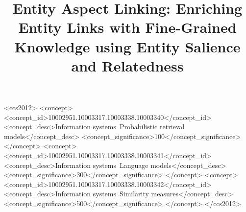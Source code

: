 \documentclass[sigconf,anonymous,review,screen]{acmart}
\begin{document}
%
\title[Entity Aspect Linking]{Entity Aspect Linking: Enriching Entity Links with Fine-Grained Knowledge using Entity Salience and Relatedness}

%

%

%


\begin{CCSXML}
<ccs2012>
   <concept>
       <concept_id>10002951.10003317.10003338.10003340</concept_id>
       <concept_desc>Information systems~Probabilistic retrieval models</concept_desc>
       <concept_significance>100</concept_significance>
       </concept>
   <concept>
       <concept_id>10002951.10003317.10003338.10003341</concept_id>
       <concept_desc>Information systems~Language models</concept_desc>
       <concept_significance>300</concept_significance>
       </concept>
   <concept>
       <concept_id>10002951.10003317.10003338.10003342</concept_id>
       <concept_desc>Information systems~Similarity measures</concept_desc>
       <concept_significance>500</concept_significance>
       </concept>
 </ccs2012>
\end{CCSXML}

\end{document}

